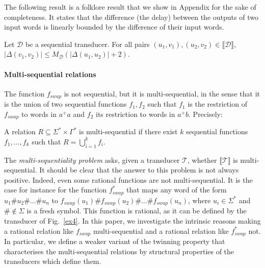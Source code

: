 \documentclass[envcountsame]{llncs}
\newcommand\inter[1]{\llbracket #1 \rrbracket}
\newcommand\tra{\mathcal{T}}
\begin{document}
The following result is a folklore result that we show in Appendix for the
sake of completeness. It states that the difference
(the delay) between the outputs of 
two input words is linearly bounded by the difference of their
input words. 
  
\vspace{-1mm}
\begin{proposition}\label{bounded_variation}
Let $\mathcal{D}$ be a sequential transducer. For all pairs $(u_1,v_1),(u_2,v_2)\in\inter{\mathcal{D}}$, $|\Delta(v_1,v_2)| \leq M_{\mathcal{D}} (|\Delta(u_1,u_2)|+2)$.
\end{proposition}

\vspace{-4mm}
\paragraph{Multi-sequential relations} The function $f_{swap}$ is not
sequential, but it is multi-sequential, in the sense that it is the
union of two sequential functions $f_1,f_2$ such that $f_1$ is the
restriction of $f_{swap}$ to words in $a^+a$ and $f_2$ its restriction
to words in $a^+b$. Precisely:

\begin{definition}
    A relation $R \subseteq \Sigma^*\times \Gamma^*$ is
    multi-sequential if there exist $k$ sequential functions
    $f_1,\dots,f_k$ such that $R = \bigcup_{i=1}^k f_i$. 
\end{definition}

The \emph{multi-sequentiality problem} asks, given a transducer $\tra$,
whether $\inter{\tra}$ is multi-sequential. It should be clear that
the answer to this problem is not always positive. Indeed, even some
rational functions are not multi-sequential. It is the case
for instance for the function $f^*_{swap}$ that maps any word of the
form $u_1\#u_2\#\dots \#u_n$ to $f_{swap}(u_1)\#f_{swap}(u_2)\#\dots
\# f_{swap}(u_n)$, where $u_i\in\Sigma^*$ and $\#\not\in\Sigma$ is a
fresh symbol. This function is rational, as it can be defined by the
transducer of Fig.~\ref{ex4}. In this paper, we investigate the intrinsic reasons
making a rational relation like $f_{swap}$ multi-sequential and a
rational relation like $f_{swap}^*$ not. In particular, we define a
weaker variant of the twinning property that characterises the
multi-sequential relations by structural properties of the transducers
which define them. 

\vspace{-5mm} 
\end{document}
